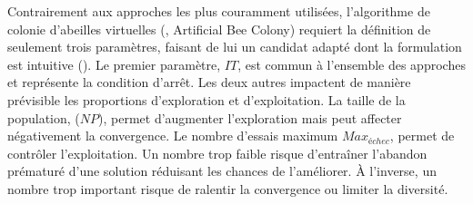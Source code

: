 Contrairement aux approches les plus couramment utilisées, l’algorithme de
colonie d’abeilles virtuelles (, Artificial Bee Colony) requiert la
définition de seulement trois paramètres, faisant de lui un candidat adapté dont
la formulation est intuitive (). Le premier paramètre,
$IT$, est commun à l’ensemble des approches et représente la condition d’arrêt.
Les deux autres impactent de manière prévisible les proportions d’exploration et
d’exploitation. La taille de la population, ($NP$), permet d’augmenter
l’exploration mais peut affecter négativement la convergence. Le nombre
d’essais maximum $Max_{échec}$, permet de contrôler l’exploitation. Un nombre
trop faible risque d’entraîner l’abandon prématuré d’une solution réduisant les chances de
l’améliorer. À l’inverse, un nombre trop important risque de ralentir la convergence
ou limiter la diversité.

